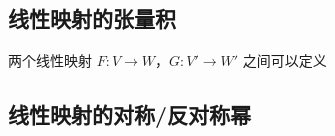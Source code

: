 
\begin{issues}
\issueDraft
{}
\end{issues}

\subsection{线性映射的张量积}

两个线性映射 $F: V \to W$，$G: V' \to W'$ 之间可以定义



\subsection{线性映射的对称/反对称幂}


